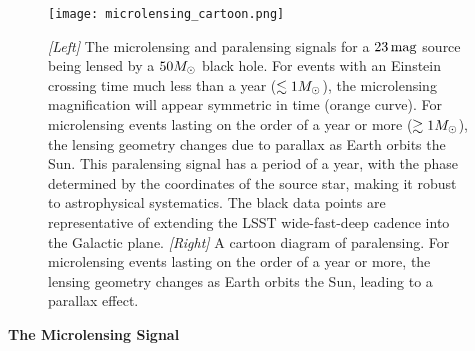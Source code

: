 \begin{figure}
\centering
\texttt{[image: microlensing\_cartoon.png]}
\vspace{1em}
\caption{\label{fig:microlensing_cartoon}
    \emph{[Left]} 
        The microlensing and paralensing signals for a $23 \mathrm{\,mag}$ source being lensed by a $50 M_\odot$ black hole. 
        For events with an Einstein crossing time much less than a year ($\lesssim 1 M_\odot$), the microlensing magnification will appear symmetric in time (orange curve).
        For microlensing events lasting on the order of a year or more ($\gtrsim 1 M_\odot$), the lensing geometry changes due to parallax as Earth orbits the Sun.
        This paralensing signal has a period of a year, with the phase determined by the coordinates of the source star, making it robust to astrophysical systematics.
        The black data points are representative of extending the LSST wide-fast-deep cadence into the Galactic plane. 
        \emph{[Right]} 
        A cartoon diagram of paralensing. 
        For microlensing events lasting on the order of a year or more, the lensing geometry changes as Earth orbits the Sun, leading to a parallax effect.
    }
\end{figure}

\noindent \textbf{The Microlensing Signal}

